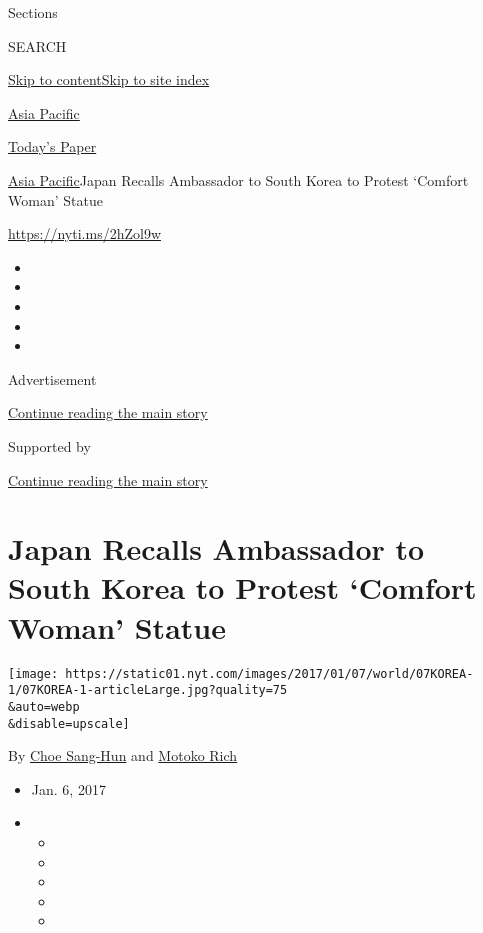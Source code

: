 Sections

SEARCH

\protect\hyperlink{site-content}{Skip to
content}\protect\hyperlink{site-index}{Skip to site index}

\href{https://www.nytimes.com/section/world/asia}{Asia Pacific}

\href{https://myaccount.nytimes.com/auth/login?response_type=cookie\&client_id=vi}{}

\href{https://www.nytimes.com/section/todayspaper}{Today's Paper}

\href{/section/world/asia}{Asia Pacific}\textbar{}Japan Recalls
Ambassador to South Korea to Protest `Comfort Woman' Statue

\url{https://nyti.ms/2hZol9w}

\begin{itemize}
\item
\item
\item
\item
\item
\end{itemize}

Advertisement

\protect\hyperlink{after-top}{Continue reading the main story}

Supported by

\protect\hyperlink{after-sponsor}{Continue reading the main story}

\hypertarget{japan-recalls-ambassador-to-south-korea-to-protest-comfort-woman-statue}{%
\section{Japan Recalls Ambassador to South Korea to Protest `Comfort
Woman'
Statue}\label{japan-recalls-ambassador-to-south-korea-to-protest-comfort-woman-statue}}

\texttt{[image: https://static01.nyt.com/images/2017/01/07/world/07KOREA-1/07KOREA-1-articleLarge.jpg?quality=75\\\&auto=webp\\\&disable=upscale]}

By \href{http://www.nytimes.com/by/choe-sang-hun}{Choe Sang-Hun} and
\href{http://www.nytimes.com/by/motoko-rich}{Motoko Rich}

\begin{itemize}
\item
  Jan. 6, 2017
\item
  \begin{itemize}
  \item
  \item
  \item
  \item
  \item
  \end{itemize}
\end{itemize}

